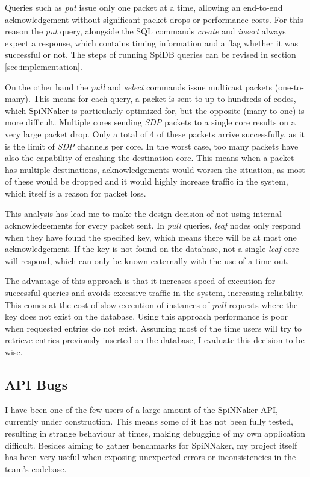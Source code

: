 Queries such as \textit{put} issue only one packet at a time, allowing an end-to-end acknowledgement without significant packet drops or performance costs. For this reason the \textit{put} query, alongside the SQL commands \textit{create} and \textit{insert} always expect a response, which contains timing information and a flag whether it was successful or not. The steps of running SpiDB queries can be revised in section \ref{sec:implementation}.

On the other hand the \textit{pull} and \textit{select} commands issue multicast packets (one-to-many). This means for each query, a packet is sent to up to hundreds of codes, which SpiNNaker is particularly optimized for, but the opposite (many-to-one) is more difficult. Multiple cores sending \textit{SDP} packets to a single core results on a very large packet drop. Only a total of 4 of these packets arrive successfully, as it is the limit of \textit{SDP} channels per core. In the worst case, too many packets have also the capability of crashing the destination core.
This means when a packet has multiple destinations, acknowledgements would worsen the situation, as most of these would be dropped and it would highly increase traffic in the system, which itself is a reason for packet loss.

This analysis has lead me to make the design decision of not using internal acknowledgements for every packet sent. In \textit{pull} queries, \textit{leaf} nodes only respond when they have found the specified key, which means there will be at most one acknowledgement. If the key is not found on the database, not a single \textit{leaf} core will respond, which can only be known externally with the use of a time-out.

The advantage of this approach is that it increases speed of execution for successful queries and avoids excessive traffic in the system, increasing reliability. This comes at the cost of slow execution of instances of \textit{pull} requests where the key does not exist on the database. Using this approach performance is poor when requested entries do not exist. Assuming most of the time users will try to retrieve entries previously inserted on the database, I evaluate this decision to be wise.

\subsection{API Bugs}
I have been one of the few users of a large amount of the SpiNNaker API, currently under construction. This means some of it has not been fully tested, resulting in strange behaviour at times, making debugging of my own application difficult. Besides aiming to gather benchmarks for SpiNNaker, my project itself has been very useful when exposing unexpected errors or inconsistencies in the team's codebase.

